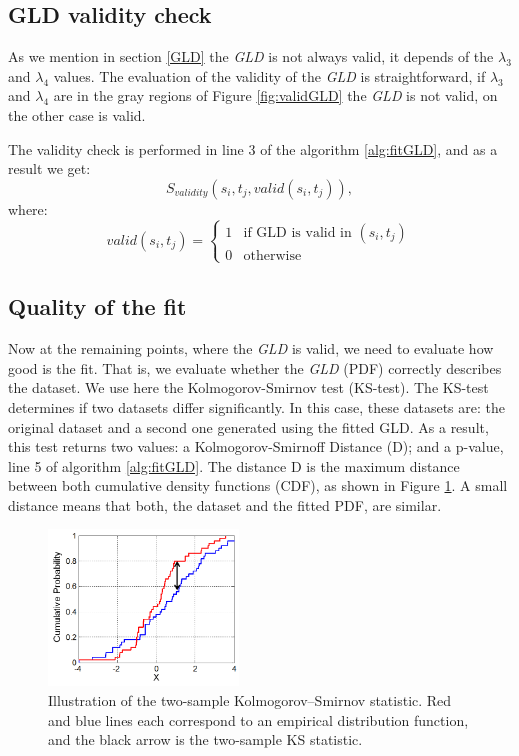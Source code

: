 \subsection{GLD validity check}
As we mention in section \ref{GLD} the \textit{GLD} is not always valid, it depends of the $\lambda_{3}$  and $\lambda_{4}$ values. The evaluation of the validity of the \textit{GLD} is straightforward, if $\lambda_{3}$  and $\lambda_{4}$ are in the gray regions of Figure \ref{fig:validGLD} the \textit{GLD} is not valid, on the other case is valid.

The validity check is performed in line 3 of the algorithm \ref{alg:fitGLD}, and as a result we get:
\begin{equation}
S_{validity}(s_{i},t_{j},valid(s_{i},t_{j})),
\end{equation}
where:
\begin{equation}
  valid(s_{i},t_{j}) =
  \begin{cases}
    1 & \text{if GLD is valid in $(s_{i},t_{j})$} \\
    0 & \text{otherwise}
  \end{cases}
\end{equation}

\subsection{Quality of the fit}
\label{Quality of the fit}
Now at the remaining points, where the \textit{GLD} is valid, we need to evaluate how good is the fit. That is, we evaluate whether the \textit{GLD} (PDF) correctly describes the dataset. We use here the Kolmogorov-Smirnov test (KS-test). The KS-test  determines if two datasets differ significantly. In this case, these datasets are: the original dataset and a second one generated using the fitted GLD. As a result, this test returns two values: a Kolmogorov-Smirnoff Distance (D); and a p-value, line 5 of algorithm \ref{alg:fitGLD}. The distance D is the maximum distance between both cumulative density functions (CDF), as shown in Figure \ref{fig:D_distance}. A small distance means that both, the dataset and the fitted PDF, are similar. 

\begin{figure}[ht]
    \centering
    \includegraphics[width=0.45\textwidth]{img/D_distance.png}
    \caption{Illustration of the two-sample Kolmogorov–Smirnov statistic. Red and blue lines each correspond to an empirical distribution function, and the black arrow is the two-sample KS statistic.}
    \label{fig:D_distance}
\end{figure}

